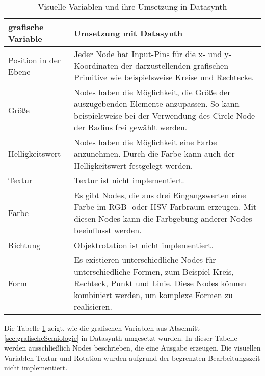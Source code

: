 \documentclass[a4paper, 
               12pt,
               DIV=calc,
               version=first,
               pdftex,
               headsepline,
               footsepline,
               bibtotocnumbered,
               liststotocnumbered]{scrreprt}
\begin{document}
\begin{table}
\centering
\begin{tabular}{|l|p{9cm}|}
\hline
\textbf{grafische Variable} & \textbf{Umsetzung mit Datasynth}\\
\hline
Position in der Ebene & Jeder Node hat Input-Pins für die x- und y-Koordinaten der darzustellenden grafischen Primitive wie
beispielsweise Kreise und Rechtecke.\\
\hline
Größe & Nodes haben die Möglichkeit, die Größe der auszugebenden Elemente anzupassen.
So kann beispielsweise bei der Verwendung des Circle-Node der Radius frei gewählt werden.\\
\hline
Helligkeitswert & Nodes haben die Möglichkeit eine Farbe anzunehmen. Durch die Farbe kann
auch der Helligkeitswert festgelegt werden.\\
\hline
Textur & Textur ist nicht implementiert.\\
\hline
Farbe & Es gibt Nodes, die aus drei Eingangswerten eine Farbe im RGB- oder HSV-Farbraum erzeugen. Mit diesen Nodes kann die Farbgebung
anderer Nodes beeinflusst werden.\\
\hline
Richtung & Objektrotation ist nicht implementiert.\\
\hline
Form & Es existieren unterschiedliche Nodes für unterschiedliche Formen, zum Beispiel Kreis, Rechteck, Punkt und Linie. Diese Nodes
können kombiniert werden, um komplexe Formen zu realisieren.\\
\hline
\end{tabular}
\caption{Visuelle Variablen und ihre Umsetzung in Datasynth}
\label{tab:vars}
\end{table}
Die Tabelle \ref{tab:vars} zeigt, wie die grafischen Variablen aus Abschnitt
\ref{sec:grafischeSemiologie} in Datasynth umgesetzt wurden. In dieser Tabelle werden ausschließlich
Nodes beschrieben, die eine Ausgabe erzeugen. Die visuellen Variablen Textur und Rotation
wurden aufgrund der begrenzten Bearbeitungszeit nicht implementiert.
\end{document}
